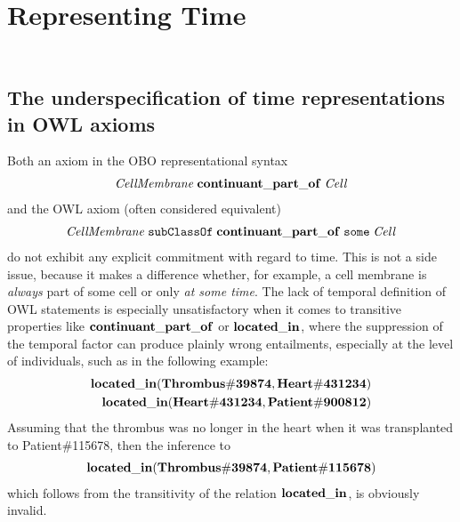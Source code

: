 \section*{Representing Time}


\subsection*{\\
The underspecification of time representations in OWL axioms}

Both an axiom in the OBO representational syntax  
%
\begin{equation}
\begin{split}
\mathit{CellMembrane}\;\mathrm{\mathbf{continuant\_part\_of}}\;\mathit{Cell}
\end{split}
\label{eq:cellobo}
\end{equation}
%
and the OWL axiom (often considered equivalent)
%
\begin{equation}
\begin{split}
\mathit{CellMembrane}\;\mathtt{subClassOf}\;\mathrm{\mathbf{continuant\_part\_of}}\;\mathtt{some}\;\mathit{Cell}
\end{split}
\label{eq:celldl}
\end{equation}
%
do not exhibit any explicit commitment with regard to time. This is not a side issue, because it makes a
difference whether, for example, a cell membrane is \emph{always} part of some cell or
only \emph{at some time}. 
The lack of temporal definition of OWL statements is especially unsatisfactory
when it comes to transitive properties like $\mathrm{\mathbf{continuant\_part\_of}}$ or $\mathrm{\mathbf{located\_in}}$,
where the suppression of the temporal factor can produce plainly wrong entailments,
especially at the level of individuals, such as in the following example:
%
\begin{equation}
\begin{split}
\mathrm{\mathbf{located\_in}} (\mathrm{\mathbf{Thrombus\#39874}}, \mathrm{\mathbf{Heart\#431234}})  \\
\mathrm{\mathbf{located\_in}} (\mathrm{\mathbf{Heart\#431234}}, \mathrm{\mathbf{Patient\#900812}})
\end{split}
\label{eq:trans}
\end{equation}
%
Assuming that the thrombus was no longer in the heart when it was transplanted to Patient\#115678, then the inference to
%
\begin{equation}
\begin{split}
\mathrm{\mathbf{located\_in}} (\mathrm{\mathbf{Thrombus\#39874}}, \mathrm{\mathbf{Patient\#115678}})
\end{split}
\label{eq:transEntailment}
\end{equation}
%
which follows from the transitivity of the relation $\mathrm{\mathbf{located\_in}}$, is obviously invalid.

